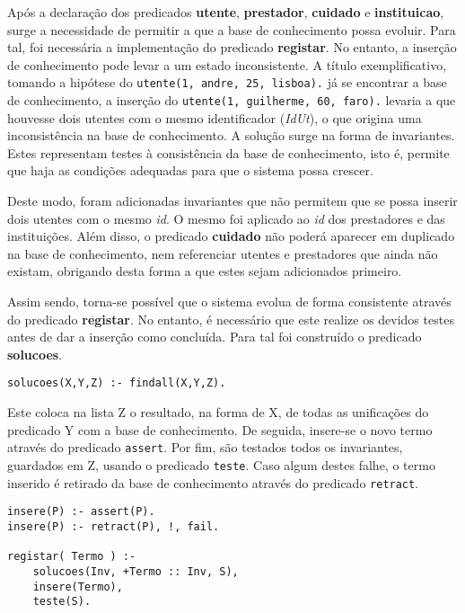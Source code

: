 \documentclass[a4paper]{article}
\begin{document}
\hspace{3mm} Após a declaração dos predicados \textbf{utente}, \textbf{prestador}, \textbf{cuidado} e \textbf{instituicao}, surge a necessidade de permitir a que a base de conhecimento possa evoluir. Para tal, foi necessária a implementação do predicado \textbf{registar}. No entanto, a inserção de conhecimento pode levar a um estado inconsistente. A título exemplificativo, tomando a hipótese do \texttt{utente(1, andre, 25, lisboa).} já se encontrar a base de conhecimento, a inserção do \texttt{utente(1, guilherme, 60, faro).} levaria a que houvesse dois utentes com o mesmo identificador (\textit{IdUt}), o que origina uma inconsistência na base de conhecimento. A solução surge na forma de invariantes. Estes representam testes à consistência da base de conhecimento, isto é, permite que haja as condições adequadas para que o sistema possa crescer.

Deste modo, foram adicionadas invariantes que não permitem que se possa inserir dois utentes com o mesmo \textit{id}. O mesmo foi aplicado ao \textit{id} dos prestadores e das instituições. Além disso, o predicado \textbf{cuidado} não poderá aparecer em duplicado na base de conhecimento, nem referenciar utentes e prestadores que ainda não existam, obrigando desta forma a que estes sejam adicionados primeiro.

Assim sendo, torna-se possível que o sistema evolua de forma consistente através do predicado \textbf{registar}. No entanto, é necessário que este realize os devidos testes antes de dar a inserção como concluída. Para tal foi construído o predicado \textbf{solucoes}.

\begin{lstlisting}[xleftmargin=.2\textwidth]
solucoes(X,Y,Z) :- findall(X,Y,Z).
\end{lstlisting}

Este coloca na lista Z o resultado, na forma de X, de todas as unificações do predicado Y com a base de conhecimento. De seguida, insere-se o novo termo através do predicado \texttt{assert}. Por fim, são testados todos os invariantes, guardados em Z, usando o predicado \texttt{teste}. Caso algum destes falhe, o termo inserido é retirado da base de conhecimento através do predicado \texttt{retract}. 

\vspace{3mm}

\begin{lstlisting}[xleftmargin=.2\textwidth]
insere(P) :- assert(P).
insere(P) :- retract(P), !, fail.

registar( Termo ) :- 
    solucoes(Inv, +Termo :: Inv, S),
    insere(Termo),
    teste(S).
\end{lstlisting}
\end{document}
